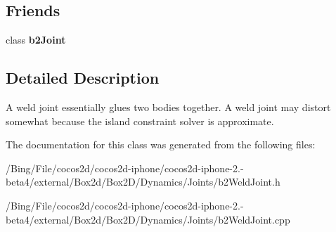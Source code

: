 \subsection*{Friends}
\begin{DoxyCompactItemize}
\item 
\hypertarget{classb2_weld_joint_a54ade8ed3d794298108d7f4c4e4793fa}{class {\bfseries b2\-Joint}}\label{classb2_weld_joint_a54ade8ed3d794298108d7f4c4e4793fa}

\end{DoxyCompactItemize}


\subsection{Detailed Description}
A weld joint essentially glues two bodies together. A weld joint may distort somewhat because the island constraint solver is approximate. 

The documentation for this class was generated from the following files\-:\begin{DoxyCompactItemize}
\item 
/\-Bing/\-File/cocos2d/cocos2d-\/iphone/cocos2d-\/iphone-\/2.-\/beta4/external/\-Box2d/\-Box2\-D/\-Dynamics/\-Joints/b2\-Weld\-Joint.\-h\item 
/\-Bing/\-File/cocos2d/cocos2d-\/iphone/cocos2d-\/iphone-\/2.-\/beta4/external/\-Box2d/\-Box2\-D/\-Dynamics/\-Joints/b2\-Weld\-Joint.\-cpp\end{DoxyCompactItemize}
